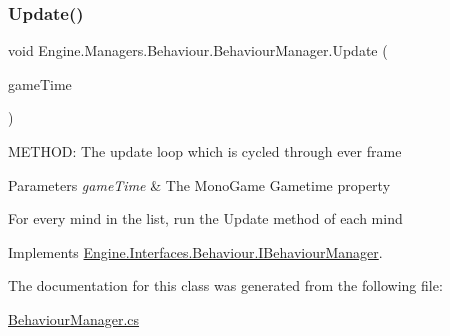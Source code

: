 \mbox{\label{a00486_a729bf10d2469de0497d75dfadbf56506}} 
\subsubsection{\texorpdfstring{Update()}{Update()}}
{\footnotesize\ttfamily void Engine.\+Managers.\+Behaviour.\+Behaviour\+Manager.\+Update (\begin{DoxyParamCaption}\item[{Game\+Time}]{game\+Time }\end{DoxyParamCaption})\hspace{0.3cm}{\ttfamily [inline]}}



M\+E\+T\+H\+OD\+: The update loop which is cycled through ever frame 


\begin{DoxyParams}{Parameters}
{\em game\+Time} & The Mono\+Game Gametime property\\
\hline
\end{DoxyParams}
For every mind in the list, run the Update method of each mind 

Implements \hyperlink{a00418_af161090c055167e2ca3901ed13d3d128}{Engine.\+Interfaces.\+Behaviour.\+I\+Behaviour\+Manager}.



The documentation for this class was generated from the following file\+:\begin{DoxyCompactItemize}
\item 
\hyperlink{a00146}{Behaviour\+Manager.\+cs}\end{DoxyCompactItemize}
